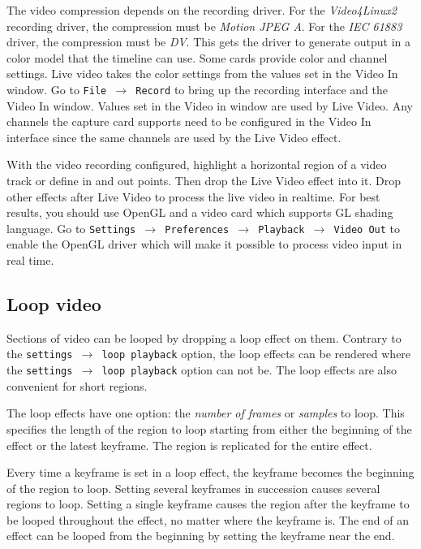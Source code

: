 The video compression depends on the recording driver. For the \textit{Video4Linux2} recording driver, the compression must be \textit{Motion JPEG A}. For the \textit{IEC 61883} driver, the compression must be \textit{DV}. This gets the driver to generate output in a color model that the timeline can use. Some cards provide color and channel settings. Live video takes the color settings from the values set in the Video In window. Go to \texttt{File $\rightarrow$ Record} to bring up the recording interface and the Video In window. Values set in the Video in window are used by Live Video. Any channels the capture card supports need to be configured in the Video In interface since the same channels are used by the Live Video effect.

With the video recording configured, highlight a horizontal region of a video track or define in and out points. Then drop the Live Video effect into it. Drop other effects after Live Video to process the live video in realtime. For best results, you should use OpenGL and a video card which supports GL shading language.  Go to \texttt{Settings $\rightarrow$ Preferences $\rightarrow$ Playback $\rightarrow$ Video Out} to enable the OpenGL driver which will make it possible to process video input in real time.

\subsection{Loop video}%
\label{sub:loop_video}

Sections of video can be looped by dropping a loop effect on them. Contrary to the \texttt{settings $\rightarrow$ loop playback} option, the loop effects can be rendered where the \texttt{settings $\rightarrow$ loop playback} option can not be. The loop effects are also convenient for short regions.

The loop effects have one option: the \textit{number of frames} or \textit{samples} to loop. This specifies the length of the region to loop starting from either the beginning of the effect or the latest keyframe. The region is replicated for the entire effect.

Every time a keyframe is set in a loop effect, the keyframe becomes the beginning of the region to loop. Setting several keyframes in succession causes several regions to loop. Setting a single keyframe causes the region after the keyframe to be looped throughout the effect, no matter where the keyframe is. The end of an effect can be looped from the beginning by setting the keyframe near the end.

